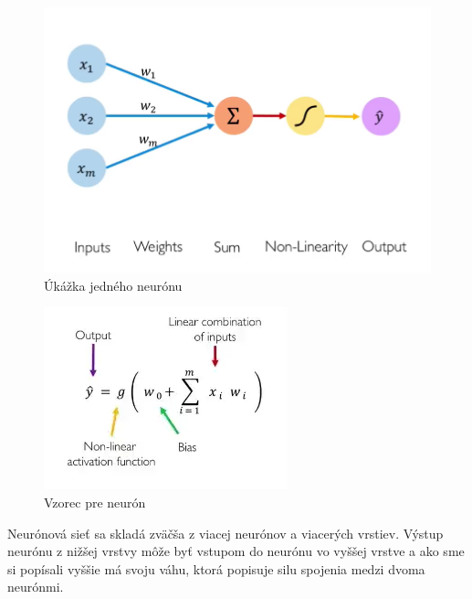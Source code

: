 \begin{figure}[!hbt]
\includegraphics[width=\textwidth]{images/neuron.png}
\centering
\caption{Úkážka jedného neurónu}
\label{fig:image}
\end{figure}

\begin{figure}[!hbt]
\includegraphics[width=\textwidth]{images/neuron_vzorec.png}
\centering
\caption{Vzorec pre neurón}
\label{fig:image}
\end{figure}

Neurónová sieť sa skladá zväčša z viacej neurónov a viacerých vrstiev. Výstup neurónu z nižšej vrstvy môže byť vstupom do neurónu vo vyššej vrstve a ako sme si popísali vyššie má svoju váhu, ktorá popisuje silu spojenia medzi dvoma neurónmi.

